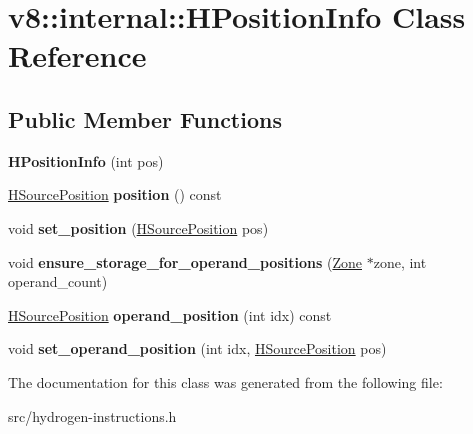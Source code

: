 \hypertarget{classv8_1_1internal_1_1_h_position_info}{}\section{v8\+:\+:internal\+:\+:H\+Position\+Info Class Reference}
\label{classv8_1_1internal_1_1_h_position_info}
\subsection*{Public Member Functions}
\begin{DoxyCompactItemize}
\item 
\hypertarget{classv8_1_1internal_1_1_h_position_info_a825a7e9d2f7c56d4a5dc349f8d4dd99e}{}{\bfseries H\+Position\+Info} (int pos)\label{classv8_1_1internal_1_1_h_position_info_a825a7e9d2f7c56d4a5dc349f8d4dd99e}

\item 
\hypertarget{classv8_1_1internal_1_1_h_position_info_a688149bb65a3243ee5b59b163af003b3}{}\hyperlink{classv8_1_1internal_1_1_h_source_position}{H\+Source\+Position} {\bfseries position} () const \label{classv8_1_1internal_1_1_h_position_info_a688149bb65a3243ee5b59b163af003b3}

\item 
\hypertarget{classv8_1_1internal_1_1_h_position_info_ac43008058325a13808269a2b531410bd}{}void {\bfseries set\+\_\+position} (\hyperlink{classv8_1_1internal_1_1_h_source_position}{H\+Source\+Position} pos)\label{classv8_1_1internal_1_1_h_position_info_ac43008058325a13808269a2b531410bd}

\item 
\hypertarget{classv8_1_1internal_1_1_h_position_info_a95f12e935243315b0f34298b9826b473}{}void {\bfseries ensure\+\_\+storage\+\_\+for\+\_\+operand\+\_\+positions} (\hyperlink{classv8_1_1internal_1_1_zone}{Zone} $\ast$zone, int operand\+\_\+count)\label{classv8_1_1internal_1_1_h_position_info_a95f12e935243315b0f34298b9826b473}

\item 
\hypertarget{classv8_1_1internal_1_1_h_position_info_a4e618e479f84b6305f475839dc688f9d}{}\hyperlink{classv8_1_1internal_1_1_h_source_position}{H\+Source\+Position} {\bfseries operand\+\_\+position} (int idx) const \label{classv8_1_1internal_1_1_h_position_info_a4e618e479f84b6305f475839dc688f9d}

\item 
\hypertarget{classv8_1_1internal_1_1_h_position_info_a248071e578bfd2644b7aaca737b132ea}{}void {\bfseries set\+\_\+operand\+\_\+position} (int idx, \hyperlink{classv8_1_1internal_1_1_h_source_position}{H\+Source\+Position} pos)\label{classv8_1_1internal_1_1_h_position_info_a248071e578bfd2644b7aaca737b132ea}

\end{DoxyCompactItemize}


The documentation for this class was generated from the following file\+:\begin{DoxyCompactItemize}
\item 
src/hydrogen-\/instructions.\+h\end{DoxyCompactItemize}
